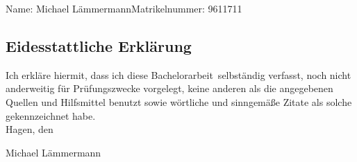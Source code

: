 \documentclass[twoside,bibliography=totoc,openany]{fumi}
\newcommand{\thesisauthor}{Michael Lämmermann}
\newcommand{\thesistype}{Bachelorarbeit} %
\newcommand{\thesismatrikelnummer}{9611711}
\begin{document}
\cleardoublepage


Name: \thesisauthor \hfill Matrikelnummer: \thesismatrikelnummer \vspace{2cm}
\subsection*{Eidesstattliche Erklärung}
Ich erkläre hiermit, dass ich diese \thesistype~selbständig verfasst, noch nicht anderweitig für Prüfungszwecke vorgelegt, keine anderen als die angegebenen Quellen und Hilfsmittel benutzt sowie wörtliche und sinngemäße Zitate als solche gekennzeichnet habe.\\[1cm]
Hagen, den \dotfill

\hspace{2cm}{\footnotesize Datum}\hspace{5cm} {\footnotesize \thesisauthor}
\end{document}
